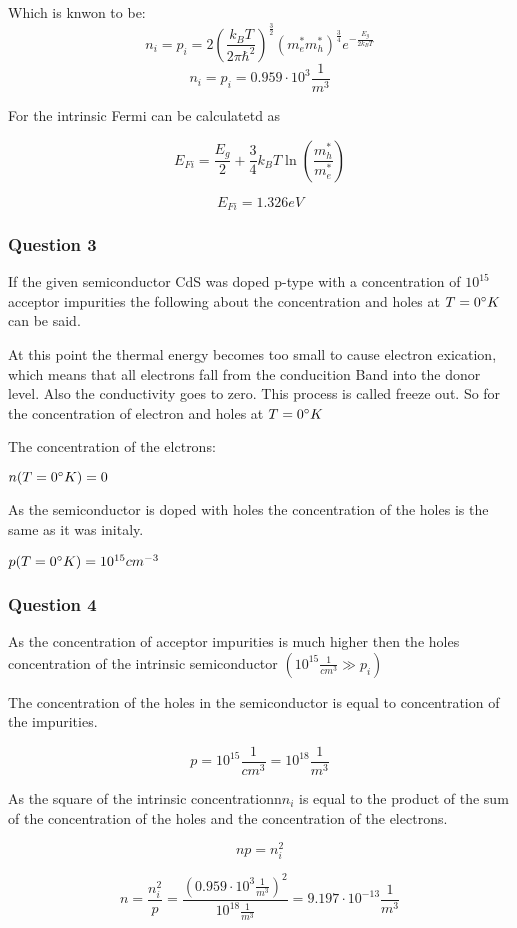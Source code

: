 Which is knwon to be:
$$n_i = p_i = 2 \left( \frac{k_BT}{2\pi\hbar^2} \right)^{\frac{3}{2}}
  (m_e^*m_h^*)^{\frac{3}{4}} e^{-\frac{E_g}{2k_BT}}$$
$$n_i = p_i = 0.959 \cdot 10^3 \frac{1}{m^3}$$

For the intrinsic Fermi can be calculatetd as 

$$E_{Fi} = \frac{E_g}{2} + \frac{3}{4} k_B T \ln\left( \frac{m_h^*}{m_e^*} \right)$$

$$E_{Fi} = 1.326 eV$$


\subsubsection*{Question 3}

If the given semiconductor CdS was doped p-type with a
concentration of $10^{15}$ acceptor impurities the following
about the concentration and holes at $T=0\degree K$ can be said.

At this point the thermal energy becomes too small to cause electron exication, which means that all electrons fall from
the conducition Band into the donor level. Also the conductivity
goes to zero. This process is called freeze out. 
So for the concentration of electron and holes at $T=0 \degree K$

The concentration of the elctrons:

$n(T=0 \degree K) = 0$

As the semiconductor is doped with holes the concentration of the
holes is the same as it was initaly.

$p(T=0 \degree K) = 10^{15}cm^{-3}$


\subsubsection*{Question 4}

As the concentration of acceptor impurities is much higher then
the holes concentration of the intrinsic semiconductor 
$(10^{15} \frac{1}{cm^3} \gg p_i)$

The concentration of the holes in the semiconductor is equal to concentration
of the impurities.

$$p = 10^{15} \frac{1}{cm^3} = 10^{18} \frac{1}{m^3}$$

As the square of the intrinsic concentrationn$n_i$ is equal to the product
of the sum of the concentration of the holes and the concentration of the
electrons.

$$np = n_i^2$$

$$n = \frac{n_i^2}{p} = \frac{(0.959 \cdot 10^3 \frac{1}{m^3})^2}{10^{18} \frac{1}{m^3}} = 9.197 \cdot 10^{-13} \frac{1}{m^3}$$

